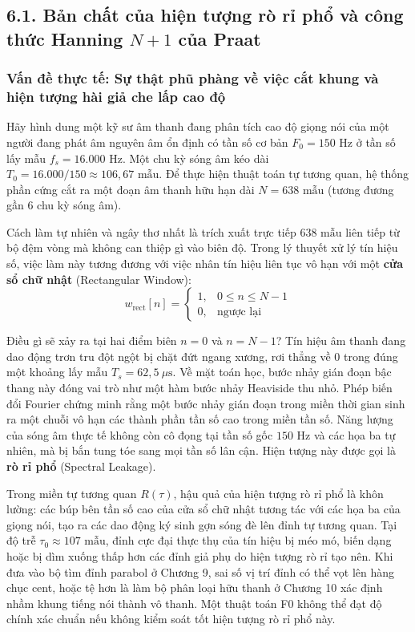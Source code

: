 \subsection*{6.1. Bản chất của hiện tượng rò rỉ phổ và công thức Hanning \texorpdfstring{$N+1$}{N+1} của Praat}

\subsubsection*{Vấn đề thực tế: Sự thật phũ phàng về việc cắt khung và hiện tượng hài giả che lấp cao độ}
Hãy hình dung một kỹ sư âm thanh đang phân tích cao độ giọng nói của một người đang phát âm nguyên âm ổn định có tần số cơ bản $F_0 = 150\text{ Hz}$ ở tần số lấy mẫu $f_s = 16.000\text{ Hz}$. Một chu kỳ sóng âm kéo dài $T_0 = 16.000 / 150 \approx 106{,}67\text{ mẫu}$. Để thực hiện thuật toán tự tương quan, hệ thống phần cứng cắt ra một đoạn âm thanh hữu hạn dài $N = 638\text{ mẫu}$ (tương đương gần $6$ chu kỳ sóng âm). 

Cách làm tự nhiên và ngây thơ nhất là trích xuất trực tiếp $638\text{ mẫu}$ liên tiếp từ bộ đệm vòng mà không can thiệp gì vào biên độ. Trong lý thuyết xử lý tín hiệu số, việc làm này tương đương với việc nhân tín hiệu liên tục vô hạn với một \textbf{cửa sổ chữ nhật} (Rectangular Window):
\begin{equation}
w_{\text{rect}}[n] = \begin{cases} 1, & 0 \le n \le N-1 \\ 0, & \text{ngược lại} \end{cases}
\end{equation}

Điều gì sẽ xảy ra tại hai điểm biên $n = 0$ và $n = N-1$? Tín hiệu âm thanh đang dao động trơn tru đột ngột bị chặt đứt ngang xương, rơi thẳng về $0$ trong đúng một khoảng lấy mẫu $T_s = 62{,}5\ \mu\text{s}$. Về mặt toán học, bước nhảy gián đoạn bậc thang này đóng vai trò như một hàm bước nhảy Heaviside thu nhỏ. Phép biến đổi Fourier chứng minh rằng một bước nhảy gián đoạn trong miền thời gian sinh ra một chuỗi vô hạn các thành phần tần số cao trong miền tần số. Năng lượng của sóng âm thực tế không còn cô đọng tại tần số gốc $150\text{ Hz}$ và các họa ba tự nhiên, mà bị bắn tung tóe sang mọi tần số lân cận. Hiện tượng này được gọi là \textbf{rò rỉ phổ} (Spectral Leakage).

Trong miền tự tương quan $R(\tau)$, hậu quả của hiện tượng rò rỉ phổ là khôn lường: các búp bên tần số cao của cửa sổ chữ nhật tương tác với các họa ba của giọng nói, tạo ra các dao động ký sinh gợn sóng đè lên đỉnh tự tương quan. Tại độ trễ $\tau_0 \approx 107\text{ mẫu}$, đỉnh cực đại thực thụ của tín hiệu bị méo mó, biến dạng hoặc bị dìm xuống thấp hơn các đỉnh giả phụ do hiện tượng rò rỉ tạo nên. Khi đưa vào bộ tìm đỉnh parabol ở Chương 9, sai số vị trí đỉnh có thể vọt lên hàng chục cent, hoặc tệ hơn là làm bộ phân loại hữu thanh ở Chương 10 xác định nhầm khung tiếng nói thành vô thanh. Một thuật toán F0 không thể đạt độ chính xác chuẩn nếu không kiểm soát tốt hiện tượng rò rỉ phổ này.

